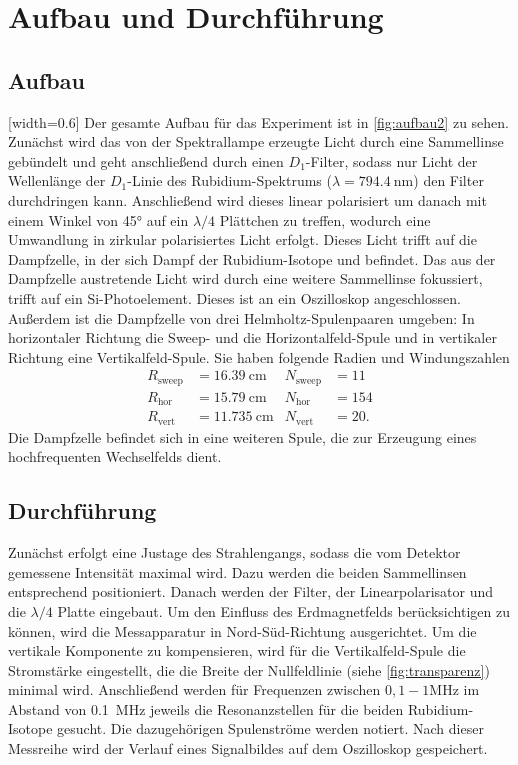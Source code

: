 \section {Aufbau und Durchführung}
\label{sec:durchführung}

\subsection{Aufbau}
[width=0.6\textwidth]
Der gesamte Aufbau für das Experiment ist in \autoref{fig:aufbau2} zu sehen. Zunächst wird das von der Spektrallampe erzeugte Licht durch eine Sammellinse gebündelt und geht anschließend durch einen $D_1$-Filter, sodass nur Licht der Wellenlänge der $D_1$-Linie des Rubidium-Spektrums ($\lambda = \SI{794,4}{\nano\meter}$) den Filter durchdringen kann. Anschließend wird dieses linear polarisiert um danach mit einem Winkel von 45° auf ein $\lambda/4$ Plättchen zu treffen, wodurch eine Umwandlung in zirkular polarisiertes Licht erfolgt. Dieses Licht trifft auf die Dampfzelle, in der sich Dampf der Rubidium-Isotope  und  befindet. Das aus der Dampfzelle austretende Licht wird durch eine weitere Sammellinse fokussiert, trifft auf ein Si-Photoelement. Dieses ist an ein Oszilloskop angeschlossen. Außerdem ist die Dampfzelle von drei Helmholtz-Spulenpaaren umgeben: In horizontaler Richtung die Sweep- und die Horizontalfeld-Spule und in vertikaler Richtung eine Vertikalfeld-Spule. Sie haben folgende Radien und Windungszahlen
\begin{align}
  R_\mathrm{sweep} &= \SI{16,39}{\centi\meter}& N_\mathrm{sweep} &= 11 \\
  R_\mathrm{hor} &= \SI{15,79}{\centi\meter} & N_\mathrm{hor} &= 154 \\
  R_\mathrm{vert} &= \SI{11,735}{\centi\meter} & N_\mathrm{vert} &= 20.
\end{align}
Die Dampfzelle befindet sich in eine weiteren Spule, die zur Erzeugung eines hochfrequenten Wechselfelds dient.

\subsection{Durchführung}
Zunächst erfolgt eine Justage des Strahlengangs, sodass die vom Detektor gemessene Intensität maximal wird. Dazu werden die beiden Sammellinsen entsprechend positioniert. Danach werden der Filter, der Linearpolarisator und die $\lambda/4$ Platte eingebaut.
Um den Einfluss des Erdmagnetfelds berücksichtigen zu können, wird die Messapparatur in Nord-Süd-Richtung ausgerichtet. Um die vertikale Komponente zu kompensieren, wird für die Vertikalfeld-Spule die Stromstärke eingestellt, die die Breite der Nullfeldlinie (siehe \autoref{fig:transparenz}) minimal wird. Anschließend werden für Frequenzen zwischen $0,1-1\si{\mega\Hz}$ im Abstand von \SI{0,1}{\mega\Hz} jeweils die Resonanzstellen für die beiden Rubidium-Isotope gesucht. Die dazugehörigen Spulenströme werden notiert. Nach dieser Messreihe wird der Verlauf eines Signalbildes auf dem Oszilloskop gespeichert.
